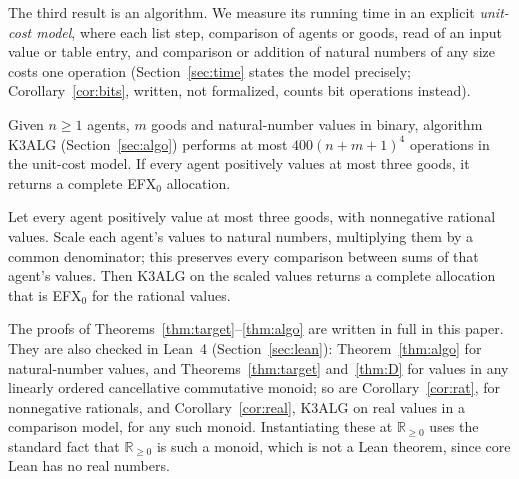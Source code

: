 \documentclass[runningheads,11pt]{llncs}
\newcommand{\efxz}{\texorpdfstring{\mbox{EFX$_0$}}{EFX0}}
\begin{document}
\noindent The third result is an algorithm. We measure its running time in an explicit \emph{unit-cost model}, where each list step, comparison of agents or goods, read of an input value or table entry, and comparison or addition of natural numbers of any size costs one operation (Section~\ref{sec:time} states the model precisely; Corollary~\ref{cor:bits}, written, not formalized, counts bit operations instead).

\begin{theorem}[algorithm]\label{thm:algo}
Given $n\ge1$ agents, $m$ goods and natural-number values in binary, algorithm K3ALG (Section~\ref{sec:algo}) performs at most $400(n+m+1)^4$ operations in the unit-cost model. If every agent positively values at most three goods, it returns a complete \efxz{} allocation.
\end{theorem}

\begin{corollary}\label{cor:rat}
Let every agent positively value at most three goods, with nonnegative rational values. Scale each agent's values to natural numbers, multiplying them by a common denominator; this preserves every comparison between sums of that agent's values. Then K3ALG on the scaled values returns a complete allocation that is \efxz{} for the rational values.
\end{corollary}

\noindent The proofs of Theorems~\ref{thm:target}--\ref{thm:algo} are written in full in this paper. They are also checked in Lean~4 (Section~\ref{sec:lean}): Theorem~\ref{thm:algo} for natural-number values, and Theorems~\ref{thm:target} and~\ref{thm:D} for values in any linearly ordered cancellative commutative monoid; so are Corollary~\ref{cor:rat}, for nonnegative rationals, and Corollary~\ref{cor:real}, K3ALG on real values in a comparison model, for any such monoid. Instantiating these at $\mathbb{R}_{\ge0}$ uses the standard fact that $\mathbb{R}_{\ge0}$ is such a monoid, which is not a Lean theorem, since core Lean has no real numbers.
\end{document}

